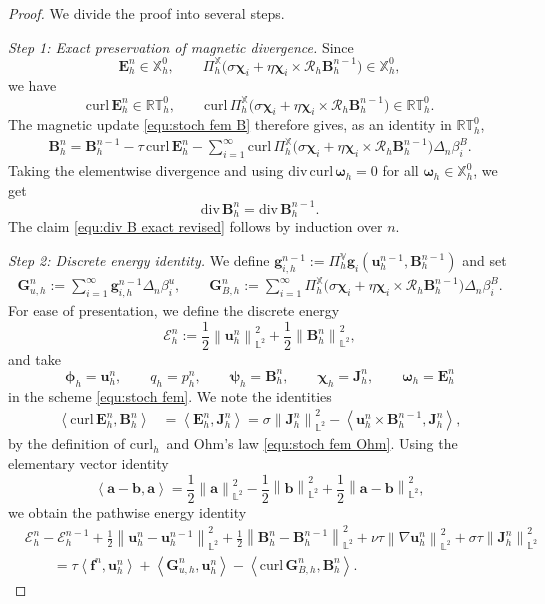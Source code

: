 \documentclass[11pt, reqno]{amsart}
\theoremstyle{definition}
\numberwithin{equation}{section}
\newcommand{\curl}{\mathrm{curl}\,}
\newcommand{\divg}{\mathrm{div}\,}
\newcommand{\bff}{\boldsymbol}
\newcommand{\bb}{\mathbb}
\newcommand{\norm}[2]{\left\|{#1}\right\|_{#2}}
\newcommand{\inpro}[2]{\left\langle#1,#2\right\rangle}
\newcommand{\curlh}{\mathrm{curl}_h\,}
\begin{document}
\begin{proof}
	We divide the proof into several steps.
	
	\emph{Step 1: Exact preservation of magnetic divergence.}
	Since
	\[
	\bff E_h^n\in\bb X_h^0,
	\qquad
	\Pi_h^{\bb X}\bigl(\sigma\bff\chi_i+\eta\bff\chi_i\times\mathcal R_h\bff B_h^{n-1}\bigr)\in\bb X_h^0,
	\]
	we have
	\[
	\curl\bff E_h^n\in\bb{RT}_h^0,
	\qquad
	\curl\Pi_h^{\bb X}\bigl(\sigma\bff\chi_i+\eta\bff\chi_i\times\mathcal R_h\bff B_h^{n-1}\bigr)\in\bb{RT}_h^0.
	\]
	The magnetic update \eqref{equ:stoch fem B} therefore gives, as an identity in $\bb{RT}_h^0$,
	\begin{align}\label{equ:B update strong revised}
		\bff B_h^n
		=
		\bff B_h^{n-1}
		-\tau\,\curl\bff E_h^n
		-\sum_{i=1}^{\infty}
		\curl\Pi_h^{\bb X}\bigl(\sigma\bff\chi_i+\eta\bff\chi_i\times\mathcal R_h\bff B_h^{n-1}\bigr)\Delta_n\beta_i^B.
	\end{align}
	Taking the elementwise divergence and using $\divg\curl\bff\omega_h=0$ for all $\bff\omega_h\in\bb X_h^0$, we get
	\[
	\divg\bff B_h^n=\divg\bff B_h^{n-1}.
	\]
	The claim \eqref{equ:div B exact revised} follows by induction over $n$.
	
	\emph{Step 2: Discrete energy identity.}
	We define $\bff g_{i,h}^{n-1}:= \Pi_h^{\bb V} \bff g_i(\bff u_h^{n-1},\bff B_h^{n-1})$ and set
	\begin{align}\label{equ:G u G B revised}
		\bff G_{u,h}^n
		:=
		\sum_{i=1}^{\infty}\bff g_{i,h}^{n-1}\Delta_n\beta_i^u,
		\qquad
		\bff G_{B,h}^n
		:=
		\sum_{i=1}^{\infty}
		\Pi_h^{\bb X}\bigl(\sigma\bff\chi_i+\eta\bff\chi_i\times\mathcal R_h\bff B_h^{n-1}\bigr)\Delta_n\beta_i^B.
	\end{align}
	For ease of presentation, we define the discrete energy
	\[
	\mathcal E_h^n
	:=
	\frac12\norm{\bff u_h^n}{\bb L^2}^2
	+
	\frac12\norm{\bff B_h^n}{\bb L^2}^2,
	\]
	and take 
	\[
	\bff\phi_h=\bff u_h^n,\qquad
	q_h=p_h^n,\qquad
	\bff\psi_h=\bff B_h^n,\qquad
	\bff\chi_h=\bff J_h^n,\qquad
	\bff\omega_h=\bff E_h^n
	\]
	in the scheme \eqref{equ:stoch fem}. We note the identities
	\begin{align*}
	\inpro{\curl\bff E_h^n}{\bff B_h^n}
	&=
	\inpro{\bff E_h^n}{\bff J_h^n}
	=
	\sigma\norm{\bff J_h^n}{\bb L^2}^2
	-
	\inpro{\bff u_h^n\times\bff B_h^{n-1}}{\bff J_h^n},
	\end{align*}
	by the definition of $\curlh$ and Ohm's law \eqref{equ:stoch fem Ohm}. 
	Using the elementary vector identity
	\[
	\inpro{\bff a-\bff b}{\bff a}
	=
	\frac12\norm{\bff a}{\bb L^2}^2
	-
	\frac12\norm{\bff b}{\bb L^2}^2
	+
	\frac12\norm{\bff a-\bff b}{\bb L^2}^2,
	\]
	we obtain the pathwise energy identity
	\begin{align}\label{equ:energy identity revised}
		&\mathcal E_h^n-\mathcal E_h^{n-1}
		+
		\frac12\norm{\bff u_h^n-\bff u_h^{n-1}}{\bb L^2}^2
		+
		\frac12\norm{\bff B_h^n-\bff B_h^{n-1}}{\bb L^2}^2
		+
		\nu\tau\norm{\nabla\bff u_h^n}{\bb L^2}^2
		+
		\sigma\tau\norm{\bff J_h^n}{\bb L^2}^2
		\nonumber\\
		&\qquad
		=
		\tau\inpro{\bff f^n}{\bff u_h^n}
		+
		\inpro{\bff G_{u,h}^n}{\bff u_h^n}
		-
		\inpro{\curl\bff G_{B,h}^n}{\bff B_h^n}.
	\end{align}
	

\end{proof}
\end{document}
